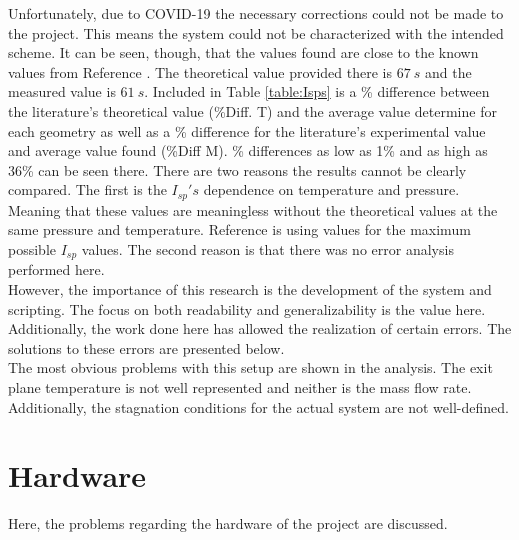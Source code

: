 Unfortunately, due to COVID-19 the necessary corrections could not be made to the project. This means the system could not be characterized with the intended scheme. It can be seen, though, that the values found are close to the known values from Reference \cite{anis}. The theoretical value provided there is $67\ s$ and the measured value is $61\ s$. Included in Table \ref{table:Isps} is a \% difference between the literature's theoretical value (\%Diff. T) and the average value determine for each geometry as well as a \% difference for the literature's experimental value and average value found (\%Diff M). \% differences as low as 1\% and as high as 36\% can be seen there. There are two reasons the results cannot be clearly compared. The first is the $I_{sp}'s$ dependence on temperature and pressure. Meaning that these values are meaningless without the theoretical values at the same pressure and temperature. Reference \cite{anis} is using values for the maximum possible $I_{sp}$ values. The second reason is that there was no error analysis performed here.\\
However, the importance of this research is the development of the system and  scripting. The focus on both readability and generalizability is the value here. Additionally, the work done here has allowed the realization of certain errors. The solutions to these errors are presented below.\\
The most obvious problems with this setup are shown in the analysis. The exit plane temperature is not well represented and neither is the mass flow rate. Additionally, the stagnation conditions for the actual system are not well-defined.
\section{Hardware}
Here, the problems regarding the hardware of the project are discussed.
